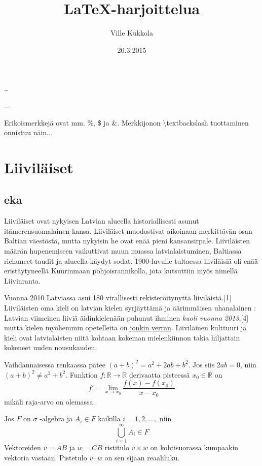 \documentclass[a4paper]{article}
\title{\LaTeX -harjoittelua}
\author{Ville Kukkola}
\date{20.3.2015}
\theoremstyle{definition}
\theoremstyle{remark}
\begin{document}
\maketitle

\tableofcontents

\dots

...

Erikoismerkkejä ovat mm. \%, \$ ja \&. Merkkijonon \textbackslash textbackslash tuottaminen onnistuu näin...


\section{Liiviläiset}

\subsection{eka}   
Liiviläiset ovat nykyisen Latvian alueella historiallisesti asunut itämerensuomalainen kansa. Liiviläiset muodostivat aikoinaan merkittävän osan Baltian väestöstä, mutta nykyisin he ovat enää pieni kansansirpale. Liiviläisten määrän hupenemiseen vaikuttivat muun muassa latvialaistuminen, Baltiassa riehuneet taudit ja alueella käydyt sodat. 1900-luvulle tultaessa liiviläisiä oli enää eristäytyneellä Kuurinmaan pohjoisrannikolla, jota kutsuttiin myös nimellä Liivinranta. 
\begin{flushright}Vuonna 2010 Latviassa asui \tiny 180 virallisesti rekisteröitynyttä \normalsize liiviläistä.[1] Liiviläisten oma kieli on latvian kielen syrjäyttämä ja \huge äärimmäisen uhanalainen \normalsize : Latvian viimeinen liiviä äidinkielenään puhunut ihminen \emph{kuoli vuonna 2013},[4] mutta kielen myöhemmin opetelleita on \underline{jonkin verran}. Liiviläinen kulttuuri ja kieli ovat latvialaisten niitä kohtaan kokeman mielenkiinnon takia hiljattain kokeneet uuden nousukauden.
\end{flushright}

Vaihdannaisessa renkaassa pätee \((a+b)^2=a^2+2ab+b^2\). Jos siis \(2ab=0\), niin $(a+b)^2 \neq a^2 + b^2$.
Funktion $f:\mathbb{R}\rightarrow\mathbb{R}$ derivaatta pisteessä $x_0\in\mathbb{R}$ on
\[
f'=\lim_{x \rightarrow x_0}\frac{f(x)-f(x_0)}{x-x_0}
\]
mikäli raja-arvo on olemassa.

Jos $F$ on $\sigma$ -algebra ja \(A_i\in F\) kaikilla $i=1,2,\dots ,$ niin
\[
\bigcup_{i=1}^\infty A_i\in F
\]
Vektoreiden $\overline{v} = \overline{AB}$ ja $\overline{w} = \overline{CB}$ ristitulo $ \overline{v} \times \overline{w}$ on kohtisuorassa kumpaakin vektoria vastaan. Pistetulo \( \overline{v} \cdotp{} \overline{w} \) on sen sijaan reaaliluku.
\end{document}
